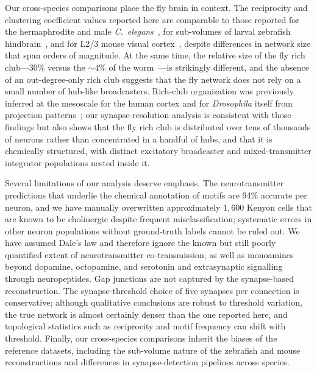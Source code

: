 \documentclass[11pt]{article}
\begin{document}
Our cross-species comparisons place the fly brain in context. The
reciprocity and clustering coefficient values reported here are
comparable to those reported for the hermaphrodite and male
\textit{C.\ elegans}~\cite{varshney2011structural,cook2019whole}, for
sub-volumes of larval zebrafish hindbrain~\cite{svara2022automated}, and
for L2/3 mouse visual cortex~\cite{song2005highly}, despite differences
in network size that span orders of magnitude. At the same time, the
relative size of the fly rich club---30\% versus the $\sim 4\%$ of the
worm~\cite{towlson2013rich}---is strikingly different, and the absence of
an out-degree-only rich club suggests that the fly network does not rely
on a small number of hub-like broadcasters. Rich-club organization was
previously inferred at the mesoscale for the human cortex and for
\textit{Drosophila} itself from projection
patterns~\cite{vandenheuvel2011rich,shih2015connectomics}; our
synapse-resolution analysis is consistent with those findings but also
shows that the fly rich club is distributed over tens of thousands of
neurons rather than concentrated in a handful of hubs, and that it is
chemically structured, with distinct excitatory broadcaster and
mixed-transmitter integrator populations nested inside it.

Several limitations of our analysis deserve emphasis. The neurotransmitter
predictions that underlie the chemical annotation of motifs are 94\%
accurate per neuron, and we have manually overwritten approximately
$1{,}600$ Kenyon cells that are known to be cholinergic despite
frequent misclassification; systematic errors in other neuron populations
without ground-truth labels cannot be ruled out. We have assumed Dale's
law and therefore ignore the known but still poorly quantified extent of
neurotransmitter co-transmission, as well as monoamines beyond dopamine,
octopamine, and serotonin and extrasynaptic signalling through
neuropeptides. Gap junctions are not captured by the synapse-based
reconstruction. The synapse-threshold choice of five synapses per
connection is conservative; although qualitative conclusions are robust
to threshold variation, the true network is almost certainly denser than
the one reported here, and topological statistics such as reciprocity and
motif frequency can shift with threshold. Finally, our cross-species
comparisons inherit the biases of the reference datasets, including the
sub-volume nature of the zebrafish and mouse reconstructions and
differences in synapse-detection pipelines across species.
\end{document}
